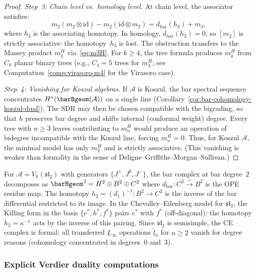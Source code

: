 \begin{proof}
\emph{Step~3: Chain level vs.\ homology level.}
At chain level, the associator satisfies:
\[
m_2(m_2 \otimes \mathrm{id}) - m_2(\mathrm{id} \otimes m_2)
= d_{\mathrm{bar}}(h_3) + m_3,
\]
where $h_3$ is the associating homotopy.  In homology,
$d_{\mathrm{bar}}(h_3) = 0$, so $[m_2]$ is strictly associative:
the homotopy~$h_3$ is lost.  The obstruction transfers to the
Massey product $m_3^H$ via~\eqref{eq:m3H}.  For $k \geq 4$,
the tree formula produces $m_k^H$ from $C_k$ planar binary trees
(e.g., $C_4 = 5$ trees for $m_4^H$; see
Computation~\ref{comp:virasoro-m4} for the Virasoro case).

\emph{Step~4: Vanishing for Koszul algebras.}
If $\mathcal{A}$ is Koszul, the bar spectral sequence
concentrates $H^*(\barBgeom(\mathcal{A}))$ on a single line
(Corollary~\ref{cor:bar-cohomology-koszul-dual}).
The SDR may then be chosen compatible with the bigrading,
so that $h$ preserves bar degree and shifts internal
(conformal weight) degree.
Every tree with $n \geq 3$ leaves contributing to $m_n^H$
would produce an operation of bidegree incompatible with
the Koszul line, forcing $m_n^H = 0$.
Thus, for Koszul $\mathcal{A}$, the minimal model has only
$m_2^H$ and is strictly associative.  (This vanishing is weaker
than formality in the sense of
Deligne--Griffiths--Morgan--Sullivan.)
\end{proof}

\begin{example}
\label{ex:sdr-sl2}
For $\mathcal{A} = V_k(\mathfrak{sl}_2)$ with generators
$\{J^+, J^0, J^-\}$, the bar complex at bar degree~$2$
decomposes as $\barBgeom^2 = H^2 \oplus B^2 \oplus C^2$
where $d_{\mathrm{bar}}\colon C^2 \xrightarrow{\sim} B^2$
is the OPE residue map.  The homotopy
$h_2 = (d_1)^{-1}\colon B^2 \to C^2$ is the inverse of the
bar differential restricted to its image.  In the Chevalley--Eilenberg
model for $\mathfrak{sl}_2$, the Killing form in the basis
$\{e^*, h^*, f^*\}$ pairs $e^*$ with $f^*$ (off-diagonal):
the homotopy $h_2 = \kappa^{-1}$ acts by the inverse of this pairing.
Since $\mathfrak{sl}_2$ is semisimple, the CE complex is formal:
all transferred $L_\infty$ operations $\tilde{l}_n$ for $n \geq 2$
vanish for degree reasons (cohomology concentrated in
degrees~$0$ and~$3$).
\end{example}

\subsubsection{Explicit Verdier duality computations}

